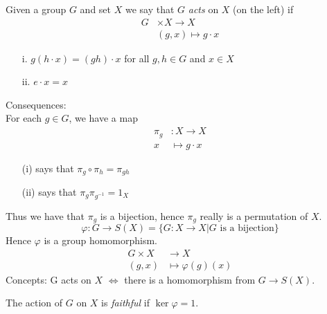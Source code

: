 \documentclass[11pt,leqno,oneside]{amsart}
\begin{document}
\begin{defn*}[1.5.1]
  Given a group \(G\) and set \(X\) we say that \(G\) \emph{acts} on \(X\) (on the left)
  if
  \begin{align*}
    G &\times X \to X\\
      &(g,x) \mapsto g\cdot x
  \end{align*}
  \begin{enumerate}
  \item[i.] \(g(h\cdot x)=(gh)\cdot x\) for all \(g,h \in G\) and \(x \in X\)
  \item[ii.] \(e\cdot x = x\)
  \end{enumerate}
\end{defn*}
\noindent Consequences:\\
For each \(g \in G\), we have a map
\begin{align*}
  \pi_g &\colon X \to X\\
  x &\mapsto g \cdot x
\end{align*}
\begin{enumerate}
\item[(i)] says that \(\pi_g \circ \pi_h = \pi_{gh}\)
\item[(ii)] says that \(\pi_g \pi_{g^{-1}} = 1_X\)
\end{enumerate}
Thus we have that \(\pi_g\) is a bijection, hence \(\pi_g\) really is a permutation of \(X\).
\[\varphi \colon G \to S(X)=\{G \colon X \to X | G \text{ is a bijection}\}\]
Hence \(\varphi\) is a group homomorphism.
\begin{align*}
  G \times X &\to X\\
  (g,x) &\mapsto \varphi(g)(x)
\end{align*}
Concepts: G acts on \(X\) \(\iff\) there is a homomorphism from \(G \to S(X)\).
\begin{defn*}[1.5.2]
  The action of \(G\) on \(X\) is \emph{faithful} if \(\ker\varphi = 1\).
\end{defn*}
\end{document}
